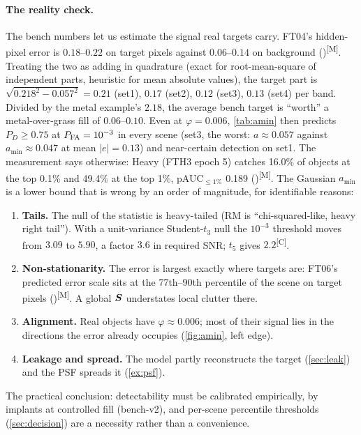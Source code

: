 \documentclass[11pt,a4paper]{article}
\theoremstyle{plain}
\theoremstyle{definition}
\theoremstyle{remark}
\newcommand{\Sm}{\B{S}}
\newcommand{\meas}{\textsuperscript{\textsf{\scriptsize[M]}}}
\newcommand{\comp}{\textsuperscript{\textsf{\scriptsize[C]}}}
\begin{document}
\paragraph{The reality check.}
The bench numbers let us estimate the signal real targets carry. FT04's hidden-pixel error is $0.18$--$0.22$ on target
pixels against $0.06$--$0.14$ on background ()\meas. Treating the two as adding in
quadrature (exact for root-mean-square of independent parts, heuristic for mean absolute values), the target part is
$\sqrt{0.218^2-0.057^2}=0.21$ (set1), $0.17$ (set2), $0.12$ (set3), $0.13$ (set4) per band. Divided by the metal
example's $2.18$, the average bench target is ``worth'' a metal-over-grass fill of $0.06$--$0.10$. Even at
$\varphi=0.006$, \cref{tab:amin} then predicts $P_D\ge0.75$ at $P_{\rm FA}=10^{-3}$ in every scene (set3, the worst:
$a\approx0.057$ against $a_{\min}\approx0.047$ at mean $|e|=0.13$) and near-certain detection on set1. The measurement says otherwise: Heavy (FTH3 epoch 5)
catches 16.0\% of objects at the top 0.1\% and 49.4\% at the top 1\%, pAUC$_{\le1\%}$ 0.189
()\meas. The Gaussian $a_{\min}$ is a lower bound that is wrong by an order of
magnitude, for identifiable reasons:
\begin{enumerate}
\item \textbf{Tails.} The null of the statistic is heavy-tailed (RM is ``chi-squared-like, heavy right tail''). With a
unit-variance Student-$t_3$ null the $10^{-3}$ threshold moves from $3.09$ to $5.90$, a factor $3.6$ in required SNR;
$t_5$ gives $2.2$\comp.
\item \textbf{Non-stationarity.} The error is largest exactly where targets are: FT06's predicted error scale sits at
the 77th--90th percentile of the scene on target pixels ()\meas. A
global $\Sm$ understates local clutter there.
\item \textbf{Alignment.} Real objects have $\varphi\approx0.006$; most of their signal lies in the directions the error
already occupies (\cref{fig:amin}, left edge).
\item \textbf{Leakage and spread.} The model partly reconstructs the target (\cref{sec:leak}) and the PSF spreads it
(\cref{ex:psf}).
\end{enumerate}
The practical conclusion: detectability must be calibrated empirically, by implants at controlled fill
(bench-v2), and per-scene percentile thresholds (\cref{sec:decision}) are a necessity rather than a convenience.
\end{document}
